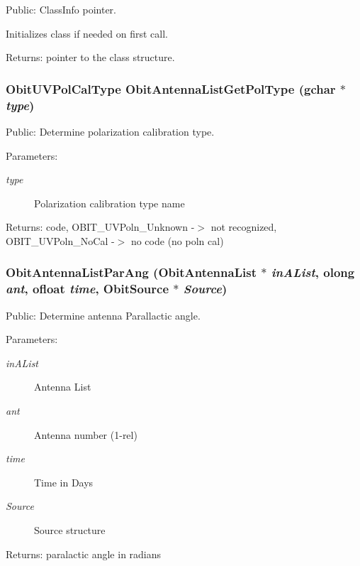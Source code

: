 Public: Class\-Info pointer. 

Initializes class if needed on first call. \begin{Desc}
\item[Returns:]pointer to the class structure. \end{Desc}
\subsubsection{\setlength{\rightskip}{0pt plus 5cm}Obit\-UVPol\-Cal\-Type Obit\-Antenna\-List\-Get\-Pol\-Type (gchar $\ast$ {\em type})}\label{ObitAntennaList_8h_a14}


Public: Determine polarization calibration type. 

\begin{Desc}
\item[Parameters:]
\begin{description}
\item[{\em type}]Polarization calibration type name \end{description}
\end{Desc}
\begin{Desc}
\item[Returns:]code, OBIT\_\-UVPoln\_\-Unknown -$>$ not recognized, OBIT\_\-UVPoln\_\-No\-Cal -$>$ no code (no poln cal) \end{Desc}
\subsubsection{ Obit\-Antenna\-List\-Par\-Ang ({\bf Obit\-Antenna\-List} $\ast$ {\em in\-AList}, {\bf olong} {\em ant}, {\bf ofloat} {\em time}, {\bf Obit\-Source} $\ast$ {\em Source})}\label{ObitAntennaList_8h_a17}


Public: Determine antenna Parallactic angle. 

\begin{Desc}
\item[Parameters:]
\begin{description}
\item[{\em in\-AList}]Antenna List \item[{\em ant}]Antenna number (1-rel) \item[{\em time}]Time in Days \item[{\em Source}]Source structure \end{description}
\end{Desc}
\begin{Desc}
\item[Returns:]paralactic angle in radians \end{Desc}
